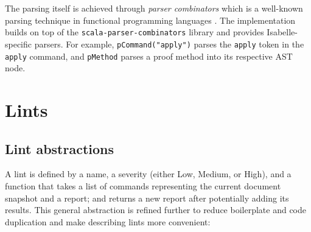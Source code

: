 The parsing itself is achieved through \textit{parser combinators} which is a 
well-known 
parsing technique in functional programming languages \cite{hutton1996monadic,wadler1985replace}.
The implementation builds on top of the \texttt{scala-parser-combinators}
library \cite{moors2008parser} and provides Isabelle-specific parsers.
For example, \texttt{pCommand("apply")} parses the \texttt{apply} 
token in the \texttt{apply} command, and \texttt{pMethod} parses a proof method
into its respective AST node.


\section{Lints}
\subsection{Lint abstractions}
A lint is defined by a name, a severity (either Low, Medium, or High),
and a function that takes a list of commands representing
the current document snapshot and a report; and returns a new report after
potentially adding its results.
This general abstraction is
refined further to reduce boilerplate and code duplication and 
make describing lints more convenient:
